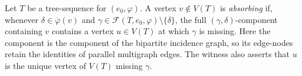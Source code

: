 \begin{definition}
Let $T$ be a tree-sequence for $(e_0,\varphi)$.  A vertex
$v\notin V(T)$ is \emph{absorbing} if, whenever
$\delta\in\overline\varphi(v)$ and
$\gamma\in\mathcal F(T,e_0,\varphi)\setminus\{\delta\}$, the full
$(\gamma,\delta)$-component containing $v$ contains a vertex
$u\in V(T)$ at which $\gamma$ is missing.  Here the component is the
component of the bipartite incidence graph, so its edge-nodes retain the
identities of parallel multigraph edges.  The witness also asserts that
$u$ is the unique vertex of $V(T)$ missing $\gamma$.
\end{definition}
